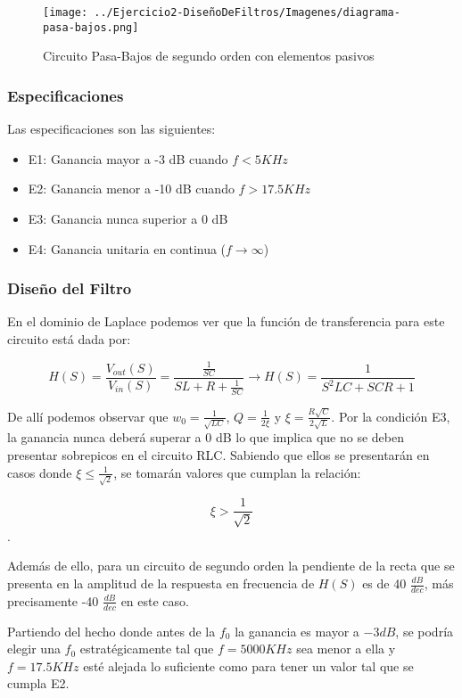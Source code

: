 \begin{figure}[H]
    \centering
    \texttt{[image: ../Ejercicio2-DiseñoDeFiltros/Imagenes/diagrama-pasa-bajos.png]}
    \caption{Circuito Pasa-Bajos de segundo orden con elementos pasivos}
\end{figure}

\subsubsection{Especificaciones}

Las especificaciones son las siguientes:

\begin{itemize}
	\item E1: Ganancia mayor a -3 dB cuando $f < 5 KHz$ 
	\item E2: Ganancia menor a -10 dB cuando $f > 17.5 KHz $
	\item E3: Ganancia nunca superior a 0 dB
	\item E4: Ganancia unitaria en continua ($f \to \infty$)
\end{itemize}

\subsubsection{Diseño del Filtro}

En el dominio de Laplace podemos ver que la función de transferencia para este circuito está dada por:

$$H(S)=\frac{V_{out}(S)}{V_{in}(S)}=\frac{\frac{1}{SC}}{SL+R+\frac{1}{SC}} \longrightarrow 
H(S)=\frac{1}{S^2LC+SCR+1}$$

De allí podemos observar que $w_0=\frac{1}{\sqrt{LC}}$, $Q=\frac{1}{2\xi}$ y $\xi=\frac{R\sqrt{C}}{2\sqrt{L}}$.
Por la condición E3, la ganancia nunca deberá superar a 0 dB lo que implica que no se deben presentar sobrepicos en el circuito RLC.
Sabiendo que ellos se presentarán en casos donde $\xi \leq \frac{1}{\sqrt{2}}$, se tomarán valores que cumplan la relación:

$$\xi > \frac{1}{\sqrt{2}}$$.

Además de ello, para un circuito de segundo orden la pendiente de la recta que se presenta en la amplitud de la respuesta en frecuencia
de $H(S)$ es de 40 $\frac{dB}{dec}$, más precisamente -40 $\frac{dB}{dec}$ en este caso. 

Partiendo del hecho donde antes de la $f_0$ la ganancia es mayor a $-3dB$, se podría elegir una $f_0$ estratégicamente tal que $f=5000KHz$ sea menor a ella y 
$f=17.5KHz$ esté alejada lo suficiente como para tener un valor tal que se cumpla E2.

